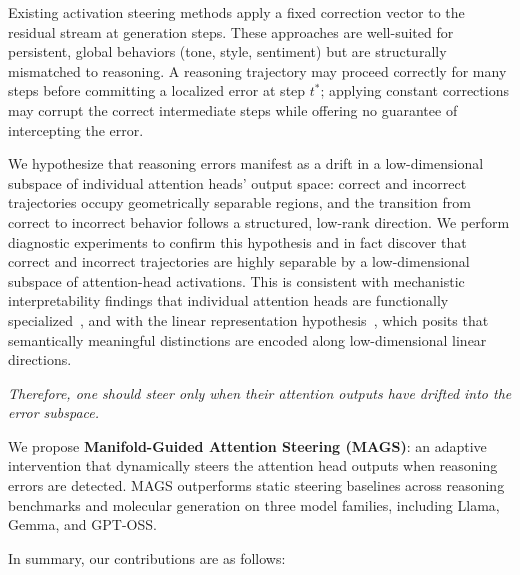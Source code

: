 \documentclass{article}
\newcommand{\ours}{MAGS}
\begin{document}
Existing activation steering methods \citep{turner2023activation, zou2023representation, panickssery2024caa, vu2025angular} apply a fixed correction vector to the residual stream at generation steps. These approaches are well-suited for persistent, global behaviors (tone, style, sentiment) but are structurally mismatched to reasoning. A reasoning trajectory may proceed correctly for many steps before committing a localized error at step $t^\ast$; applying constant corrections may corrupt the correct intermediate steps while offering no guarantee of intercepting the error.
 
We hypothesize that reasoning errors manifest as a drift in a low-dimensional subspace of individual attention heads' output space: correct and incorrect trajectories occupy geometrically separable regions, and the transition from correct to incorrect behavior follows a structured, low-rank direction.  We perform diagnostic experiments to confirm this hypothesis and in fact discover that correct and incorrect trajectories are highly separable by a low-dimensional subspace of attention-head activations. This is consistent with mechanistic interpretability findings that individual attention heads are functionally specialized~\citep{elhage2021mathematical,  wang2022interpretability}, and with the linear representation hypothesis~\citep{park2023linear}, which posits that semantically meaningful distinctions are encoded along low-dimensional linear directions. 

\begin{center}
\textit{Therefore, one should steer only when their attention outputs have drifted into the error subspace.}
\end{center}

We propose \textbf{Manifold-Guided Attention Steering (\ours{})}: an adaptive intervention that dynamically steers the attention head outputs when reasoning errors are detected. \ours{}  outperforms static steering baselines across reasoning benchmarks and molecular generation on three model families, including Llama, Gemma, and GPT-OSS.

In summary, our contributions are as follows:
\end{document}
